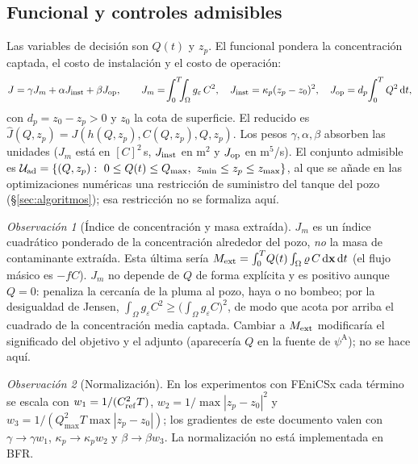 \documentclass[11pt]{article}
\numberwithin{equation}{section}
\theoremstyle{plain}
\theoremstyle{definition}
\theoremstyle{remark}
\newtheorem*{remark}{Observación}
\newcommand{\bx}{\mathbf{x}}
\newcommand{\Ceps}{g_\varepsilon}              %
\newcommand{\Nuc}{\varrho}                      %
\newcommand{\pA}{\psi^{\mathrm A}}          %
\newcommand{\dd}{\,\mathrm d}
\begin{document}
\subsection{Funcional y controles admisibles}
Las variables de decisión son $Q(t)$ y $z_p$. El funcional pondera la concentración captada, el costo de instalación y
el costo de operación:
\begin{equation}
J=\gamma J_m+\alpha J_{\rm inst}+\beta J_{\rm op},\qquad
J_m=\!\int_0^T\!\!\!\int_\Omega\Ceps\,C^2,\quad
J_{\rm inst}=\kappa_p(z_p-z_0)^2,\quad J_{\rm op}=d_p\!\int_0^TQ^2\dd t,
\label{eq:J}
\end{equation}
con $d_p=z_0-z_p>0$ y $z_0$ la cota de superficie. El reducido es $\hat J(Q,z_p)=J(h(Q,z_p),C(Q,z_p),Q,z_p)$. Los pesos $\gamma,\alpha,\beta$ absorben las unidades
($J_m$ está en $[C]^2$\,s, $J_{\rm inst}$ en m$^2$ y $J_{\rm op}$ en m$^5$/s). El conjunto admisible es
$\mathcal U_{\rm ad}=\{(Q,z_p):\ 0\le Q(t)\le Q_{\max},\ z_{\min}\le z_p\le z_{\max}\}$, al que se añade en las optimizaciones numéricas una restricción de suministro del tanque del pozo
(\S\ref{sec:algoritmos}); esa restricción no se formaliza aquí.

\begin{remark}[Índice de concentración y masa extraída]
$J_m$ es un índice cuadrático ponderado de la concentración alrededor del pozo, \emph{no} la masa de contaminante extraída. Esta última sería
$M_{\rm ext}=\int_0^T\!Q(t)\int_\Omega\Nuc\,C\dd\bx\dd t$ (el flujo másico es $-fC$). $J_m$ no depende de $Q$ de forma explícita y es positivo aunque $Q=0$: penaliza la
cercanía de la pluma al pozo, haya o no bombeo; por la desigualdad de Jensen, $\int_\Omega\Ceps C^2\ge\bigl(\int_\Omega\Ceps C\bigr)^2$, de modo que acota por arriba el cuadrado de la concentración
media captada. Cambiar a $M_{\rm ext}$ modificaría el significado del objetivo y el adjunto (aparecería $Q$ en la fuente de $\pA$); no se hace aquí.
\end{remark}
\begin{remark}[Normalización]
En los experimentos con FEniCSx cada término se escala con $w_1=1/(C_{\rm ref}^2T)$, $w_2=1/\max|z_p-z_0|^2$ y $w_3=1/(Q_{\max}^2T\max|z_p-z_0|)$; los gradientes de este documento
valen con $\gamma\to\gamma w_1$, $\kappa_p\to\kappa_pw_2$ y $\beta\to\beta w_3$. La normalización no está implementada en BFR.
\end{remark}
\end{document}
